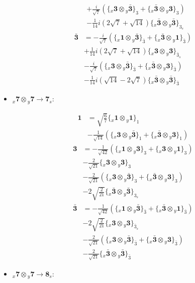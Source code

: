 \documentclass[english]{article}
\newcommand{\rep}[1]{\mathbf{#1}}
\newcommand{\repx}[2]{{}_{#2}\mathbf{#1}}
\newcommand{\tsprodx}[2]{\repx{#1}{x}\otimes\repx{#2}{y}}
\newcommand{\subcgt}[3]{\big\{ \tsprodx{#1}{#2}\big\}^{}_{#3}}
\begin{document}
\begin{itemize}
\begin{fleqn}
\begin{align*}
 & +\frac{i}{\sqrt{7}}\left(\subcgt{3}{\bar{3}}{3}+\subcgt{\bar{3}}{3}{3}\right) \\ 
 & -\frac{1}{14} i \left(2 \sqrt{7}+\sqrt{14}\right)\subcgt{\bar{3}}{\bar{3}}{3_{s}}
\end{align*}
\begin{align*}
\rep{\bar{3}} & = -\frac{i}{\sqrt{7}}\left(\subcgt{1}{\bar{3}}{\bar{3}}+\subcgt{\bar{3}}{1}{\bar{3}}\right) \\ 
 & +\frac{1}{14} i \left(2 \sqrt{7}+\sqrt{14}\right)\subcgt{3}{3}{\bar{3}_{s}} \\ 
 & -\frac{i}{\sqrt{7}}\left(\subcgt{3}{\bar{3}}{\bar{3}}+\subcgt{\bar{3}}{3}{\bar{3}}\right) \\ 
 & -\frac{1}{14} i \left(\sqrt{14}-2 \sqrt{7}\right)\subcgt{\bar{3}}{\bar{3}}{\bar{3}}
\end{align*}
\end{fleqn}
\item $\tsprodx{7}{7}\to\rep{7}_{s}$:
\begin{fleqn}
\begin{align*}
\rep{1} & = \sqrt{\frac{6}{7}}\subcgt{1}{1}{1} \\ 
 & -\frac{1}{\sqrt{14}}\left(\subcgt{3}{\bar{3}}{1}+\subcgt{\bar{3}}{3}{1}\right)
\end{align*}
\begin{align*}
\rep{3} & = -\frac{1}{\sqrt{42}}\left(\subcgt{1}{3}{3}+\subcgt{3}{1}{3}\right) \\ 
 & -\frac{2}{\sqrt{21}}\subcgt{3}{3}{3} \\ 
 & -\frac{2}{\sqrt{21}}\left(\subcgt{3}{\bar{3}}{3}+\subcgt{\bar{3}}{3}{3}\right) \\ 
 & -2 \sqrt{\frac{2}{21}}\subcgt{\bar{3}}{\bar{3}}{3_{s}}
\end{align*}
\begin{align*}
\rep{\bar{3}} & = -\frac{1}{\sqrt{42}}\left(\subcgt{1}{\bar{3}}{\bar{3}}+\subcgt{\bar{3}}{1}{\bar{3}}\right) \\ 
 & -2 \sqrt{\frac{2}{21}}\subcgt{3}{3}{\bar{3}_{s}} \\ 
 & -\frac{2}{\sqrt{21}}\left(\subcgt{3}{\bar{3}}{\bar{3}}+\subcgt{\bar{3}}{3}{\bar{3}}\right) \\ 
 & -\frac{2}{\sqrt{21}}\subcgt{\bar{3}}{\bar{3}}{\bar{3}}
\end{align*}
\end{fleqn}
\item $\tsprodx{7}{7}\to\rep{8}_{s}$:
\begin{fleqn}
\begin{align*}

\end{align*}
\end{fleqn}
\end{itemize}
\end{document}
